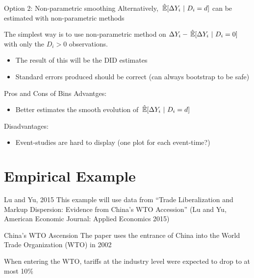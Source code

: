 \documentclass[aspectratio=43,t]{beamer}
\begin{document}
\begin{frame}{Option 2: Non-parametric smoothing}
  Alternatively, $\expechat{\Delta Y_i}{D_i = d}$ can be estimated with non-parametric methods

  \bigskip
  The simplest way is to use non-parametric method on $\Delta Y_i - \expechat{\Delta Y_i}{D_i = 0}$ with only the $D_i > 0$ observations.
  \begin{itemize}
    \item The result of this will be the DID estimates

    \item Standard errors produced should be correct (can always bootstrap to be safe)
  \end{itemize}
\end{frame}


\begin{frame}{Pros and Cons of Bins}
  Advantges:
  \begin{itemize}
    \item Better estimates the smooth evolution of $\expechat{\Delta Y_i}{D_i = d}$
  \end{itemize}

  \bigskip
  Disadvantages:
  \begin{itemize}
    \item Event-studies are hard to display (one plot for each event-time?)
  \end{itemize}
\end{frame}


\section{Empirical Example}

\begin{frame}{Lu and Yu, 2015}
  This example will use data from
  ``Trade Liberalization and Markup Dispersion: Evidence from China's WTO Accession'' (Lu and Yu, American Economic Journal: Applied Economics 2015)
\end{frame}

\begin{frame}{China's WTO Ascension}
  The paper uses the entrance of China into the World Trade Organization (WTO) in 2002

  \bigskip
  When entering the WTO, tariffs at the industry level were expected to drop to at most 10\%
\end{frame}
\end{document}
